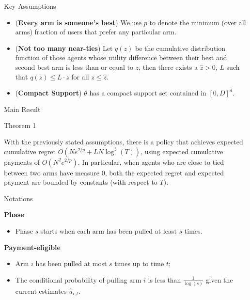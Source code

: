 \documentclass[serif]{beamer}
\begin{document}
\begin{frame}{Key Assumptions}
\begin{itemize}[label=\textbullet]
\item (\textbf{Every arm is someone's best}) We use $p$ to denote the minimum (over all arms) fraction of users that prefer any particular arm.
\vspace{0.2cm}
\item (\textbf{Not too many near-ties}) Let $q(z)$ be the cumulative distribution function of those agents whose utility difference between their best and second best arm is less than or equal to $z$, then there exists a $\hat{z}>0$, $L$ such that $q(z)\leq L\cdot z$ for all $z\leq \hat{z}$.
\vspace{0.2cm}
\item (\textbf{Compact Support}) $\theta$ has a compact support set contained in $[0,D]^{d}$.\
\end{itemize}

\end{frame}

\begin{frame}{Main Result}
\begin{block}{Theorem 1}

With the previously stated assumptions, there is a policy that achieves expected 
cumulative regret $O (N e^{2/p} + L N \log^3(T))$,
using expected cumulative payments of $O(N^2 e^{2/p})$.
\newline
\newline
In particular, when agents who are close to tied between two arms have measure $0$,
both the expected regret and expected payment are bounded by constants
(with respect to $T$). 

\end{block}

\end{frame}
\begin{frame}{Notations}

\textbf{Phase}
\begin{itemize}[label=\textbullet]
\item Phase $s$ starts when each arm has been pulled at least $s$ times.
\end{itemize}

\vspace{0.7cm}
\textbf{Payment-eligible}
\begin{itemize}[label=\textbullet]
\item Arm $i$ has been pulled at most $s$ times up to time $t$;
\item The conditional probability of pulling arm $i$ is less than $\frac{1}{\log(s)}$ given the current estimates $\hat{u}_{i,t}$.
\end{itemize}

\end{frame}
\end{document}
